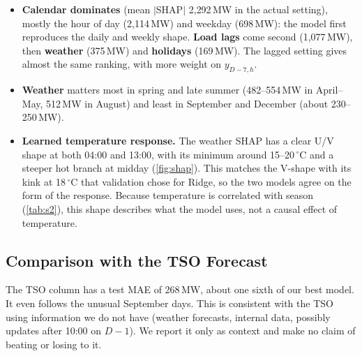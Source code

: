 \begin{itemize}
  \item \textbf{Calendar dominates} (mean $|$SHAP$|$ 2{,}292\,MW in the actual setting), mostly the
        hour of day (2{,}114\,MW) and weekday (698\,MW): the model first reproduces the daily and weekly
        shape. \textbf{Load lags} come second (1{,}077\,MW), then \textbf{weather} (375\,MW) and
        \textbf{holidays} (169\,MW). The lagged setting gives almost the same ranking, with more weight
        on $y_{D-7,h}$.
  \item \textbf{Weather} matters most in spring and late summer (482--554\,MW in April--May,
        512\,MW in August) and least in September and December (about 230--250\,MW).
  \item \textbf{Learned temperature response.} The weather SHAP has a clear U/V shape at both 04:00
        and 13:00, with its minimum around 15--20\,$^\circ$C and a steeper hot branch at midday
        (\cref{fig:shap}). This matches the V-shape with its kink at 18\,$^\circ$C that validation chose
        for Ridge, so the two models agree on the form of the response. Because temperature is
        correlated with season (\cref{tab:s2}), this shape describes what the model uses, not a causal
        effect of temperature.
\end{itemize}

\subsection{Comparison with the TSO Forecast}
\label{sec:eval-tso}

The TSO column has a test MAE of 268\,MW, about one sixth of our best model. It even follows the
unusual September days. This is consistent with the TSO using information we do not have (weather
forecasts, internal data, possibly updates after 10:00 on $D-1$). We report it only as context and
make no claim of beating or losing to it.

